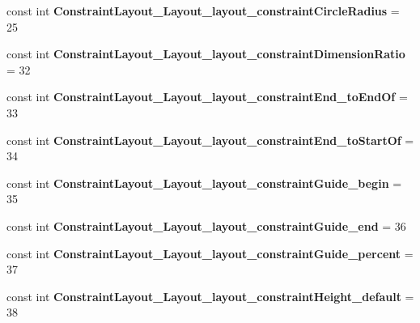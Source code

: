 \begin{DoxyCompactItemize}
const int {\bfseries Constraint\+Layout\+\_\+\+Layout\+\_\+layout\+\_\+constraint\+Circle\+Radius} = 25
\item 
\mbox{\label{classst_delivery_1_1_resource_1_1_styleable_a0400c3cbc5d3150e5bcb2e27d855b1f2}} 
const int {\bfseries Constraint\+Layout\+\_\+\+Layout\+\_\+layout\+\_\+constraint\+Dimension\+Ratio} = 32
\item 
\mbox{\label{classst_delivery_1_1_resource_1_1_styleable_a8a6a66810963c7d0a4d2ea93bb8748f4}} 
const int {\bfseries Constraint\+Layout\+\_\+\+Layout\+\_\+layout\+\_\+constraint\+End\+\_\+to\+End\+Of} = 33
\item 
\mbox{\label{classst_delivery_1_1_resource_1_1_styleable_a05fe4be0adc43ef1d6a1f802a18c73ce}} 
const int {\bfseries Constraint\+Layout\+\_\+\+Layout\+\_\+layout\+\_\+constraint\+End\+\_\+to\+Start\+Of} = 34
\item 
\mbox{\label{classst_delivery_1_1_resource_1_1_styleable_a41d2f242cafc760c8be3034a80de7743}} 
const int {\bfseries Constraint\+Layout\+\_\+\+Layout\+\_\+layout\+\_\+constraint\+Guide\+\_\+begin} = 35
\item 
\mbox{\label{classst_delivery_1_1_resource_1_1_styleable_a921b8ba8ef3266dea827b08db93e21eb}} 
const int {\bfseries Constraint\+Layout\+\_\+\+Layout\+\_\+layout\+\_\+constraint\+Guide\+\_\+end} = 36
\item 
\mbox{\label{classst_delivery_1_1_resource_1_1_styleable_a5b2f28abaff4f5862bff06bce70aa93a}} 
const int {\bfseries Constraint\+Layout\+\_\+\+Layout\+\_\+layout\+\_\+constraint\+Guide\+\_\+percent} = 37
\item 
\mbox{\label{classst_delivery_1_1_resource_1_1_styleable_a64df2863cdb444ee37e639906e8b66e1}} 
const int {\bfseries Constraint\+Layout\+\_\+\+Layout\+\_\+layout\+\_\+constraint\+Height\+\_\+default} = 38
\item 
\mbox{\label{classst_delivery_1_1_resource_1_1_styleable_a6c9cd86a53336bdf479d0b78311635d9}} 

\end{DoxyCompactItemize}

